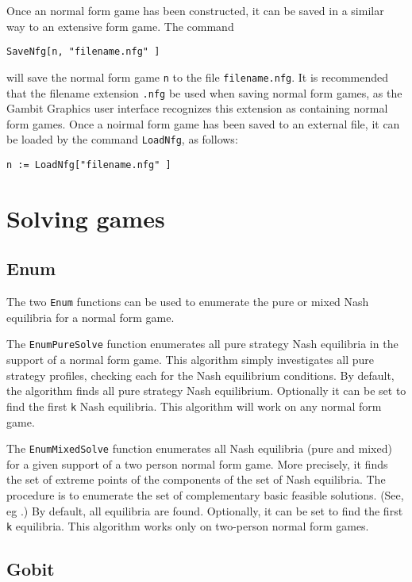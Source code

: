 Once an normal form game has been constructed, it can be saved in a
similar way to an extensive form game.  The command 

\begin{verbatim}
SaveNfg[n, "filename.nfg" ]
\end{verbatim}

\noindent
will save the normal form game \verb+n+ to the file
\verb+filename.nfg+.  It is recommended that the
filename extension \verb+.nfg+ be used when saving normal form games, as
the Gambit Graphics user interface recognizes this extension as
containing normal form games.  Once a noirmal form game has been
saved to an external file, it can be loaded by the command
\verb+LoadNfg+, as follows:

\begin{verbatim}
n := LoadNfg["filename.nfg" ]
\end{verbatim}

\section{Solving games}

\subsection{Enum}

The two {\tt Enum} functions can be used to enumerate the pure or
mixed Nash equilibria for a normal form game. 

The {\tt EnumPureSolve} function enumerates all pure strategy Nash
equilibria in the support of a normal form game.  This
algorithm simply investigates all pure strategy profiles, checking
each for the Nash equilibrium conditions.  By default, the algorithm
finds all pure strategy Nash equilibrium.  Optionally it can be set to
find the first \verb+k+ Nash equilibria.  This algorithm will work on
any normal form game.  

The {\tt EnumMixedSolve} function enumerates all Nash equilibria (pure and
mixed) for a given support of a two person normal form
game.  More precisely, it finds the set of extreme points of the
components of the set of Nash equilibria.  The procedure is to
enumerate the set of complementary basic feasible solutions. (See, eg
\cite[1964]{Man:64}.)  By default, all equilibria are found.
Optionally, it can be set to find the first \verb+k+ equilibria.  
This algorithm works only on two-person normal form games.  

\subsection{Gobit}


